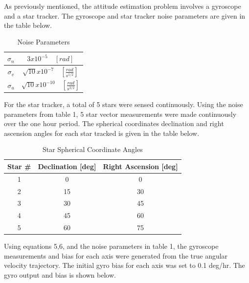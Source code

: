 \documentclass[12pt]{report}
\begin{document}
\noindent As previously mentioned, the attitude estimation problem involves a gyroscope and a star tracker. The gyroscope and star tracker noise parameters are given in the table below. 

\begin{table}[h]
	\begin{center}
		\caption{Noise Parameters }
		\begin{tabular}{|c|c|}
			\hline
			$\sigma_n$ & $3x10^{-5} \quad [rad]$ \\
			\hline
			$\sigma_v$ & $\sqrt{10}x10^{-7} \quad [\frac{rad}{s^{1/2}}]$  \\
			\hline
			$\sigma_u$ & $\sqrt{10}x10^{-10} \quad  [\frac{rad}{s^{3/2}}]$ \\
			\hline

		\end{tabular}
		\label{table:noise parameters}
	\end{center}
\end{table}  

\noindent For the star tracker, a total of 5 stars were sensed continuously. Using the noise parameters from table 1, 5 star vector measurements were made continuously over the one hour period. The spherical coordinates declination and right ascension angles for each star tracked is given in the table below. 
\newpage
\begin{table}[h]
	\begin{center}
		\caption{Star Spherical Coordinate Angles}
		\begin{tabular}{|c|c|c|}
			\hline
			Star \# & Declination [deg] & Right Ascension [deg] \\
			\hline
			1 & 0 & 0  \\
			\hline
			2 & 15 & 30  \\
			\hline
			3 & 30 & 45  \\
			\hline
			4 & 45 & 60  \\
			\hline
			5 & 60 & 75  \\
			\hline
		\end{tabular}
		\label{table: star angles}
	\end{center}
\end{table}  

\noindent Using equations 5,6, and the noise parameters in table 1, the gyroscope measurements and bias for each axis were generated from the true angular velocity trajectory. The initial gyro bias for each axis was set to 0.1 deg/hr. The gyro output and bias is shown below. 
\end{document}
